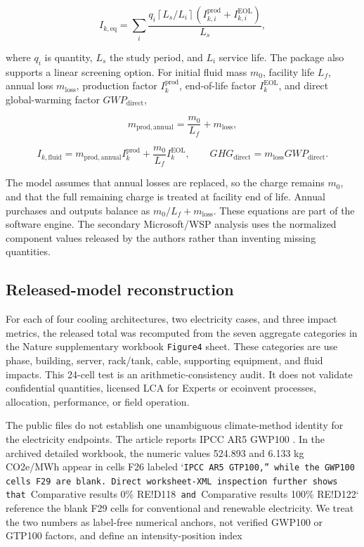 \documentclass[review,12pt]{elsarticle}
\begin{document}
\[
I_{k,\mathrm{eq}} =
\sum_i
\frac{q_i\left\lceil L_s/L_i\right\rceil
\left(I_{k,i}^{\mathrm{prod}}+I_{k,i}^{\mathrm{EOL}}\right)}
{L_s},
\tag{4}
\]

where $q_i$ is quantity, $L_s$ the study period, and $L_i$ service life. The package also supports a linear screening option. For initial fluid mass $m_0$, facility life $L_f$, annual loss $m_\mathrm{loss}$, production factor $I_k^\mathrm{prod}$, end-of-life factor $I_k^\mathrm{EOL}$, and direct global-warming factor $GWP_\mathrm{direct}$,

\[
m_\mathrm{prod,annual}=\frac{m_0}{L_f}+m_\mathrm{loss},
\tag{5}
\]

\[
I_{k,\mathrm{fluid}}=m_\mathrm{prod,annual}I_k^\mathrm{prod}
+\frac{m_0}{L_f}I_k^\mathrm{EOL},
\qquad
GHG_\mathrm{direct}=m_\mathrm{loss}GWP_\mathrm{direct}.
\tag{6}
\]

The model assumes that annual losses are replaced, so the charge remains $m_0$, and that the full remaining charge is treated at facility end of life. Annual purchases and outputs balance as $m_0/L_f+m_\mathrm{loss}$. These equations are part of the software engine. The secondary Microsoft/WSP analysis uses the normalized component values released by the authors rather than inventing missing quantities.

\subsection{Released-model reconstruction}
For each of four cooling architectures, two electricity cases, and three impact metrics, the released total was recomputed from the seven aggregate categories in the Nature supplementary workbook \texttt{Figure4} sheet. These categories are use phase, building, server, rack/tank, cable, supporting equipment, and fluid impacts. This 24-cell test is an arithmetic-consistency audit. It does not validate confidential quantities, licensed LCA for Experts or ecoinvent processes, allocation, performance, or field operation.

The public files do not establish one unambiguous climate-method identity for the electricity endpoints. The article reports IPCC AR5 GWP100 \cite{ref14}. In the archived detailed workbook, the numeric values 524.893 and 6.133 kg CO2e/MWh appear in cells F26 labeled `\texttt{IPCC AR5 GTP100,'' while the GWP100 cells F29 are blank. Direct worksheet-XML inspection further shows that }Comparative results 0\% RE!D118\texttt{ and }Comparative results 100\% RE!D122` reference the blank F29 cells for conventional and renewable electricity. We treat the two numbers as label-free numerical anchors, not verified GWP100 or GTP100 factors, and define an intensity-position index
\end{document}

